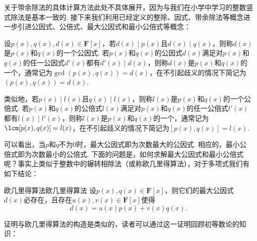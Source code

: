 关于带余除法的具体计算方法此处不具体展开，因为与我们在小学中学习的整数竖式除法是基本一致的. 接下来我们利用已经定义的整除、因式、带余除法等概念进一步引进公因式、公倍式、最大公因式和最小公倍式等概念：
\begin{definition}{}{}
    设$p(x),q(x),d(x)\in\mathbf{F}[x]$，若$d(x) \mid p(x)$且$d(x) \mid q(x)$，则称$d(x)$是$p(x)$和$q(x)$的一个公因式. 若$p(x)$和$q(x)$的公因式$d(x)$满足对$p(x)$和$q(x)$的任一公因式$d'(x)$都有$d'(x) \mid d(x)$，则称$d(x)$是$p(x)$和$q(x)$的一个，通常记为$\gcd(p(x),q(x))=d(x)$，在不引起歧义的情况下简记为$(p(x),q(x))=d(x)$.

    类似地，若$p(x) \mid l(x)$且$q(x) \mid l(x)$，则称$l(x)$是$p(x)$和$q(x)$的一个公倍式. 若$p(x)$和$q(x)$的公倍式$l(x)$满足对$p(x)$和$q(x)$的任一公倍式$l'(x)$都有$l(x) \mid l'(x)$，则称$l(x)$是$p(x)$和$q(x)$的一个，通常记为$\lcm[p(x),q(x)]=l(x)$，在不引起歧义的情况下简记为$[p(x),q(x)]=l(x)$.
\end{definition}
可以看出，当$p$和$q$不为0时，最大公因式即为次数最大的公因式. 相应的，最小公倍式即为次数最小的公倍式. 下面的问题是，如何求解最大公因式和最小公倍式呢？事实上类似于整数中的辗转相除法（或称欧几里得算法），对于多项式我们有如下结论：
\begin{theorem}{欧几里得算法}{欧几里得算法}
    设$p(x),q(x)\in\mathbf{F}[x]$，则它们的最大公因式$d(x)$必存在，且存在$u(x),v(x)\in\mathbf{F}[x]$使得
    \begin{equation}
        d(x)=u(x)p(x)+v(x)q(x).
    \end{equation}
\end{theorem}
证明与欧几里得算法的构造是类似的，读者可以通过这一证明回顾初等数论的知识：

